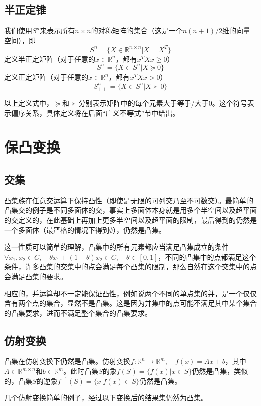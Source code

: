 \documentclass[12pt,a4paper]{book}
\begin{document}
\subsection{半正定锥}

我们使用$S^n$来表示所有$n\times n$的对称矩阵的集合（这是一个$n(n+1)/2$维的向量空间），即
$$S^n=\{X\in\mathbb{R}^{n\times n}|X=X^T \}$$
定义半正定矩阵（对于任意的$x\in\mathbb{R}^n$，都有$x^TXx\geq 0$）
$$S^n_+ = \{X\in S^n|X\succeq 0\}$$
定义正定矩阵（对于任意的$x\in\mathbb{R}^n$，都有$x^TXx> 0$）$$S^n_{++} = \{X\in S^n|X\succ 0\}$$

以上定义式中，$\succeq$和$\succ$分别表示矩阵中的每个元素大于等于/大于0。这个符号表示偏序关系，具体定义将在后面“广义不等式”节中给出。

\section{保凸变换}
\subsection{交集}

凸集族在任意交运算下保持凸性（即使是无限的可列交乃至不可数交）。最简单的凸集交的例子是不同多面体的交，事实上多面体本身就是用多个半空间以及超平面的交定义的，在此基础上再加上更多半空间以及超平面的限制，最后得到的仍然是一个多面体（最严格的情况下得到$\emptyset$），仍然是凸集。

这一性质可以简单的理解，凸集中的所有元素都应当满足凸集成立的条件$\forall x_1,x_2 \in C,\quad\theta x_1 + (1 - \theta)x_2 \in C,\quad \theta \in [0,1]$，不同的凸集中的点都满足这个条件，许多凸集的交集中的点会满足每个凸集的限制，那么自然在这个交集中的点会满足凸集的要求。

相应的，并运算却不一定能保证凸性，例如说两个不同的单点集的并，是一个仅仅含有两个点的集合，显然不是凸集。这是因为并集中的点可能不满足其中某个集合的凸集要求，进而不满足整个集合的凸集要求。

\subsection{仿射变换}

凸集在仿射变换下仍然是凸集。仿射变换$f:\mathbb{R}^n\to\mathbb{R}^m,\quad f(x)=Ax+b$，其中$A\in\mathbb{R}^{m \times n}$和$b\in\mathbb{R}^m$。此时凸集$S$的象$f(S) = \{f(x)|x\in S\}$仍然是凸集，类似的，凸集$S$的逆象$f^{-1}(S) = \{x|f(x)\in S\}$仍然是凸集。

几个仿射变换简单的例子，经过以下变换后的结果集仍然为凸集。
\end{document}
